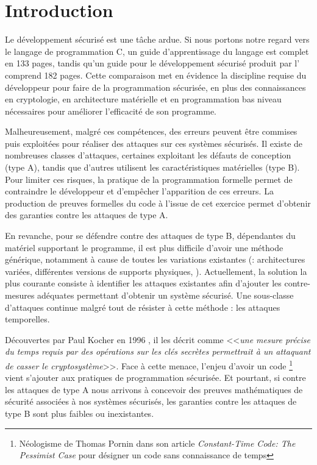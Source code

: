 \chapter*{Introduction}

Le développement sécurisé est une tâche ardue. Si nous portons notre regard vers le langage de programmation C, un guide \cite{progC_guide} d'apprentissage du langage est complet en 133 pages, tandis qu'un guide pour le développement sécurisé\cite{anssi_guideForSecureprogramming} produit par l' comprend 182 pages. Cette comparaison met en évidence la discipline requise du développeur pour faire de la programmation sécurisée, en plus des connaissances en cryptologie, en architecture matérielle et en programmation bas niveau nécessaires pour améliorer l'efficacité de son programme. \medbreak

Malheureusement, malgré ces compétences, des erreurs peuvent être commises puis exploitées pour réaliser des attaques sur ces systèmes sécurisés. Il existe de nombreuses classes d'attaques, certaines exploitant les défauts de conception (type A), tandis que d'autres utilisent les caractéristiques matérielles (type B). Pour limiter ces risques, la pratique de la programmation formelle permet de contraindre le développeur et d'empêcher l'apparition de ces erreurs. La production de preuves formelles du code à l'issue de cet exercice permet d'obtenir des garanties contre les attaques de type A.\medbreak

En revanche, pour se défendre contre des attaques de type B, dépendantes du matériel supportant le programme, il est plus difficile d'avoir une méthode générique, notamment à cause de toutes les variations existantes (\eg : architectures variées, différentes versions de supports physiques, \etc). Actuellement, la solution la plus courante consiste à identifier les attaques existantes afin d'ajouter les contre-mesures adéquates permettant d'obtenir un système sécurisé. Une sous-classe d'attaques continue malgré tout de résister à cette méthode : les attaques temporelles.\medbreak

Découvertes par Paul Kocher en 1996 \cite{crypto-1996-1469}, il les décrit comme <<\textit{une mesure précise du temps requis par des opérations sur les clés secrètes permettrait à un attaquant de casser le cryptosystème}>>. Face à cette menace, l'enjeu d'avoir un code \textit{}\footnote{Néologisme de Thomas Pornin dans son article \textit{Constant-Time Code: The Pessimist Case} \cite{constantTimePornin} pour désigner un code sans connaissance de temps} vient s'ajouter aux pratiques de programmation sécurisée. Et pourtant, si contre les attaques de type A nous arrivons à concevoir des preuves mathématiques de sécurité associées à nos systèmes sécurisés, les garanties contre les attaques de type B sont plus faibles ou inexistantes.\medbreak

